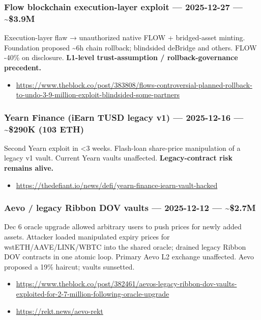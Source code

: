 \subsubsection{Flow blockchain execution-layer exploit --- 2025-12-27 --- \textasciitilde\$3.9M}\label{flow-blockchain-execution-layer-exploit-2025-12-27-3.9m}

Execution-layer flaw → unauthorized native FLOW + bridged-asset minting. Foundation proposed \textasciitilde6h chain rollback; blindsided deBridge and others. FLOW -40\% on disclosure. \textbf{L1-level trust-assumption / rollback-governance precedent.}

\begin{itemize}
\tightlist
\item
  \url{https://www.theblock.co/post/383808/flows-controversial-planned-rollback-to-undo-3-9-million-exploit-blindsided-some-partners}
\end{itemize}

\subsubsection{Yearn Finance (iEarn TUSD legacy v1) --- 2025-12-16 --- \textasciitilde\$290K (103 ETH)}\label{yearn-finance-iearn-tusd-legacy-v1-2025-12-16-290k-103-eth}

Second Yearn exploit in \textless3 weeks. Flash-loan share-price manipulation of a legacy v1 vault. Current Yearn vaults unaffected. \textbf{Legacy-contract risk remains alive.}

\begin{itemize}
\tightlist
\item
  \url{https://thedefiant.io/news/defi/yearn-finance-iearn-vault-hacked}
\end{itemize}

\subsubsection{Aevo / legacy Ribbon DOV vaults --- 2025-12-12 --- \textasciitilde\$2.7M}\label{aevo-legacy-ribbon-dov-vaults-2025-12-12-2.7m}

Dec 6 oracle upgrade allowed arbitrary users to push prices for newly added assets. Attacker loaded manipulated expiry prices for wstETH/AAVE/LINK/WBTC into the shared oracle; drained legacy Ribbon DOV contracts in one atomic loop. Primary Aevo L2 exchange unaffected. Aevo proposed a 19\% haircut; vaults sunsetted.

\begin{itemize}
\tightlist
\item
  \url{https://www.theblock.co/post/382461/aevos-legacy-ribbon-dov-vaults-exploited-for-2-7-million-following-oracle-upgrade}
\item
  \url{https://rekt.news/aevo-rekt}
\end{itemize}

